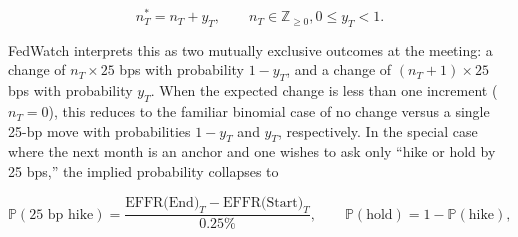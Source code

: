$$n_T^{*} = n_T + y_T,\qquad n_T \in \mathbb{Z}_{\ge 0}, 0 \le y_T < 1.$$

FedWatch interprets this as two mutually exclusive outcomes at the meeting: a change of $n_T \times 25$ bps with probability $1-y_T$, and a change of $(n_T{+}1)\times 25$ bps with probability $y_T$. When the expected change is less than one increment ($n_T=0$), this reduces to the familiar binomial case of no change versus a single 25-bp move with probabilities $1-y_T$ and $y_T$, respectively. In the special case where the next month is an anchor and one wishes to ask only “hike or hold by 25 bps,” the implied probability collapses to

$$\mathbb{P}(\text{25 bp hike})
= \frac{\text{EFFR(End)}_{T}-\text{EFFR(Start)}_{T}}{0.25\%},
\qquad
\mathbb{P}(\text{hold})=1-\mathbb{P}(\text{hike}),$$


